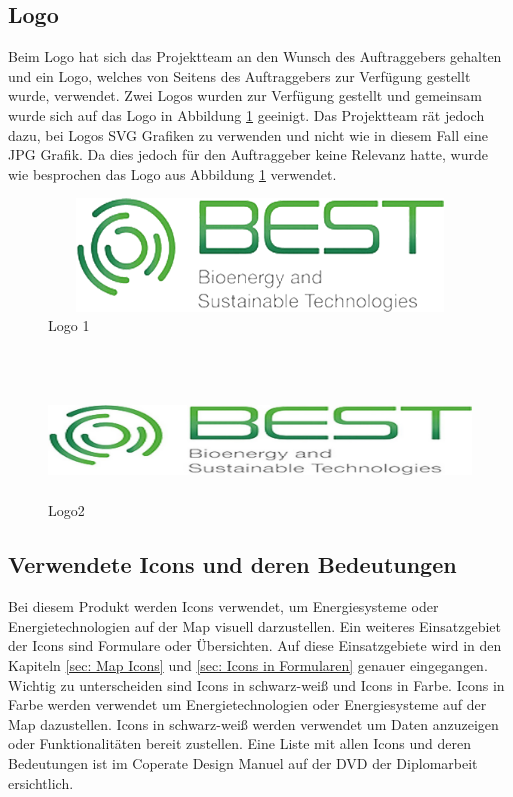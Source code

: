 \subsection{Logo}\label{sec: Logo}
Beim Logo hat sich das Projektteam an den Wunsch des Auftraggebers gehalten und ein Logo, welches von Seitens des Auftraggebers zur Verfügung gestellt wurde, verwendet. Zwei Logos wurden zur Verfügung gestellt und gemeinsam wurde sich auf das Logo in Abbildung \ref{fig: Logo1} geeinigt. Das Projektteam rät jedoch dazu, bei Logos SVG Grafiken zu verwenden und nicht wie in diesem Fall eine JPG Grafik. Da dies jedoch für den Auftraggeber keine Relevanz hatte, wurde wie besprochen das Logo aus Abbildung \ref{fig: Logo1}  verwendet.
\\
\begin{figure}[h]
	\centering
	\includegraphics[height=3cm,width=14cm]{images/Logo1}
	\caption{Logo 1}
	\label{fig: Logo1}
\end{figure}
\\
\begin{figure}[h]
	\centering
	\includegraphics[height=3cm,width=14cm]{images/Logo2}
	\caption{Logo2}
	\label{fig: Logo2}
\end{figure}

\newpage
\subsection{Verwendete Icons und deren Bedeutungen} \label{sec:Verwendete Icons und deren Bedeutungen}
Bei diesem Produkt werden Icons verwendet, um Energiesysteme oder Energietechnologien auf der Map visuell darzustellen. Ein weiteres Einsatzgebiet der Icons sind Formulare oder Übersichten. Auf diese Einsatzgebiete wird in den Kapiteln  \ref{sec: Map Icons} und \ref{sec: Icons in Formularen} genauer eingegangen. Wichtig zu unterscheiden sind Icons in schwarz-weiß und Icons in Farbe. Icons in Farbe werden verwendet um Energietechnologien oder Energiesysteme auf der Map dazustellen. Icons in schwarz-weiß werden verwendet um Daten anzuzeigen oder Funktionalitäten bereit zustellen.
Eine Liste mit allen Icons und deren Bedeutungen ist im Coperate Design Manuel auf der DVD der Diplomarbeit ersichtlich.





